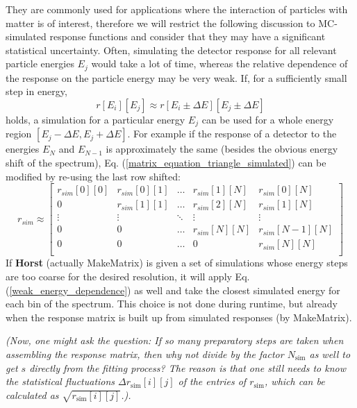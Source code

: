 \documentclass{article}
\begin{document}
They are commonly used for applications where the interaction of particles with matter is of interest, therefore we will restrict the following discussion to MC-simulated response functions and consider that they may have a significant statistical uncertainty.
Often, simulating the detector response for all relevant particle energies $E_j$ would take a lot of time, whereas the relative dependence of the response on the particle energy may be very weak.
If, for a sufficiently small step in energy,
%
\begin{equation}
\label{weak_energy_dependence}
r[E_i][E_j] \approx r[E_i \pm \Delta E][E_j \pm \Delta E]
\end{equation}
%
holds, a simulation for a particular energy $E_j$ can be used for a whole energy region $\left[ E_j - \Delta E, E_j + \Delta E \right]$.
For example if the response of a detector to the energies $E_N$ and $E_{N-1}$ is approximately the same (besides the obvious energy shift of the spectrum), Eq. (\ref{matrix_equation_triangle_simulated}) can be modified by re-using the last row shifted:
%
\begin{equation}
	\label{matrix_equation_triangle_approximation}
	r_{sim} \approx 
	\begin{bmatrix}
		r_{sim}[0][0] & r_{sim}[0][1] & \hdots & r_{sim}[1][N] & r_{sim}[0][N]   \\
		0             & r_{sim}[1][1] & \hdots & r_{sim}[2][N] & r_{sim}[1][N]   \\
		\vdots        & \vdots        & \ddots & \vdots        & \vdots          \\
		0             & 0             & \hdots & r_{sim}[N][N] & r_{sim}[N-1][N] \\
		0             & 0             & \hdots & 0             & r_{sim}[N][N]   \\
	\end{bmatrix}
\end{equation}
%
If \textbf{Horst} (actually MakeMatrix) is given a set of simulations whose energy steps are too coarse for the desired resolution, it will apply Eq. (\ref{weak_energy_dependence}) as well and take the closest simulated energy for each bin of the spectrum.
This choice is not done during runtime, but already when the response matrix is built up from simulated responses (by MakeMatrix).

\textit{(Now, one might ask the question: If so many preparatory steps are taken when assembling the response matrix, then why not divide by the factor $N_\mathrm{sim}$ as well to get $s$ directly from the fitting process?
The reason is that one still needs to know the statistical fluctuations $\Delta r_\mathrm{sim}[i][j]$ of the entries of $r_\mathrm{sim}$, which can be calculated as $\sqrt{r_\mathrm{sim}[i][j] }$.).}
\end{document}
